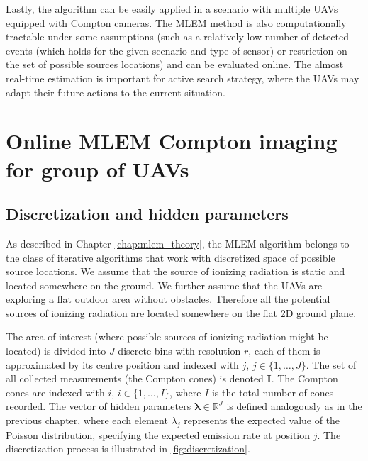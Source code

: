 Lastly, the algorithm can be easily applied in a scenario with multiple \ac{UAV}s equipped with Compton cameras.
The \ac{MLEM} method is also computationally tractable under some assumptions 
(such as a relatively low number of detected events (which holds for the given scenario and type of sensor) or restriction on the set of possible sources locations)
and can be evaluated online.
The almost real-time estimation is important for active search strategy, where the \ac{UAV}s may adapt their future actions to the current situation.

\section{Online MLEM Compton imaging for group of \ac{UAV}s}
\label{sec:setup}
\subsection{Discretization and hidden parameters}
As described in Chapter \ref{chap:mlem_theory}, the \ac{MLEM} algorithm belongs to the class of iterative algorithms that work with discretized space of possible source locations.
We assume that the source of ionizing radiation is static and located somewhere on the ground.
We further assume that the \ac{UAV}s are exploring a flat outdoor area without obstacles. Therefore all the potential sources of ionizing radiation are located somewhere on the flat 2D ground plane.

The area of interest (where possible sources of ionizing radiation might be located) is divided into $J$ discrete bins with resolution $r$, each of them is approximated by its centre position and indexed with $j$, $j \in \{1, \dots , J\}$.
The set of all collected measurements (the Compton cones) is denoted $\mathbf{I}$.
The Compton cones are indexed with $i$, $i \in \{1, \dots, I\}$, where $I$ is the total number of cones recorded.
The vector of hidden parameters $\bm{\lambda}\in \mathbb{R}^{J}$ is defined analogously as in the previous chapter, where each element $\lambda_{j}$ represents the expected value of the Poisson distribution, specifying the expected emission rate at position $j$.
The discretization process is illustrated in  \autoref{fig:discretization}.


